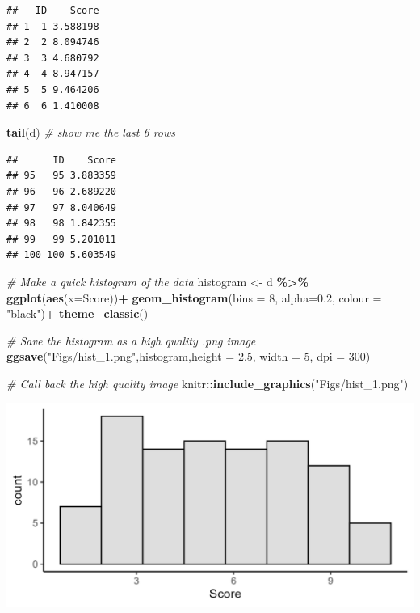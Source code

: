 \documentclass[
]{book}
\newenvironment{Shaded}{\begin{snugshade}}{\end{snugshade}}
\newcommand{\AttributeTok}[1]{\textcolor[rgb]{0.13,0.29,0.53}{#1}}
\newcommand{\CommentTok}[1]{\textcolor[rgb]{0.56,0.35,0.01}{\textit{#1}}}
\newcommand{\DecValTok}[1]{\textcolor[rgb]{0.00,0.00,0.81}{#1}}
\newcommand{\FloatTok}[1]{\textcolor[rgb]{0.00,0.00,0.81}{#1}}
\newcommand{\FunctionTok}[1]{\textcolor[rgb]{0.13,0.29,0.53}{\textbf{#1}}}
\newcommand{\NormalTok}[1]{#1}
\newcommand{\OtherTok}[1]{\textcolor[rgb]{0.56,0.35,0.01}{#1}}
\newcommand{\SpecialCharTok}[1]{\textcolor[rgb]{0.81,0.36,0.00}{\textbf{#1}}}
\newcommand{\StringTok}[1]{\textcolor[rgb]{0.31,0.60,0.02}{#1}}
\begin{document}
\begin{verbatim}
##   ID    Score
## 1  1 3.588198
## 2  2 8.094746
## 3  3 4.680792
## 4  4 8.947157
## 5  5 9.464206
## 6  6 1.410008
\end{verbatim}

\begin{Shaded}
\begin{Highlighting}[]
\FunctionTok{tail}\NormalTok{(d) }\CommentTok{\# show me the last 6 rows}
\end{Highlighting}
\end{Shaded}

\begin{verbatim}
##      ID    Score
## 95   95 3.883359
## 96   96 2.689220
## 97   97 8.040649
## 98   98 1.842355
## 99   99 5.201011
## 100 100 5.603549
\end{verbatim}

\begin{Shaded}
\begin{Highlighting}[]
\CommentTok{\# Make a quick histogram of the data}
\NormalTok{histogram }\OtherTok{\textless{}{-}}\NormalTok{ d }\SpecialCharTok{\%\textgreater{}\%}
  \FunctionTok{ggplot}\NormalTok{(}\FunctionTok{aes}\NormalTok{(}\AttributeTok{x=}\NormalTok{Score))}\SpecialCharTok{+}
  \FunctionTok{geom\_histogram}\NormalTok{(}\AttributeTok{bins =} \DecValTok{8}\NormalTok{, }\AttributeTok{alpha=}\FloatTok{0.2}\NormalTok{, }\AttributeTok{colour =} \StringTok{"black"}\NormalTok{)}\SpecialCharTok{+}
  \FunctionTok{theme\_classic}\NormalTok{()}

\CommentTok{\# Save the histogram as a high quality .png image}
\FunctionTok{ggsave}\NormalTok{(}\StringTok{"Figs/hist\_1.png"}\NormalTok{,histogram,}\AttributeTok{height =} \FloatTok{2.5}\NormalTok{, }\AttributeTok{width =} \DecValTok{5}\NormalTok{, }\AttributeTok{dpi =} \DecValTok{300}\NormalTok{)}

\CommentTok{\# Call back the high quality image }
\NormalTok{knitr}\SpecialCharTok{::}\FunctionTok{include\_graphics}\NormalTok{(}\StringTok{"Figs/hist\_1.png"}\NormalTok{)}
\end{Highlighting}
\end{Shaded}

\includegraphics[width=20.83in]{Figs/hist_1}
\end{document}
